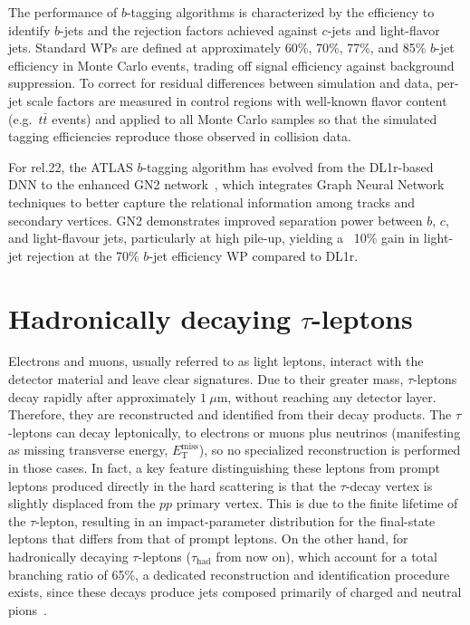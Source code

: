 The performance of $b$-tagging algorithms is characterized by the efficiency to identify $b$-jets and the rejection factors achieved against $c$-jets and light-flavor jets. Standard WPs are defined at approximately 60\%, 70\%, 77\%, and 85\% $b$-jet efficiency in \ttbar Monte Carlo events, trading off signal efficiency against background suppression.  To correct for residual differences between simulation and data, per-jet scale factors are measured in control regions with well-known flavor content (e.g.\ $t\bar t$ events) and applied to all Monte Carlo samples so that the simulated tagging efficiencies reproduce those observed in collision data.

For rel.22, the ATLAS $b$-tagging algorithm has evolved from the DL1r-based DNN to the enhanced GN2 network~\cite{new_tagging}, which integrates Graph Neural Network techniques to better capture the relational information among tracks and secondary vertices. GN2 demonstrates improved separation power between \(b\), \(c\), and light-flavour jets, particularly at high pile-up, yielding a ~10\% gain in light-jet rejection at the 70\% \(b\)-jet efficiency WP compared to DL1r.  


\section{Hadronically decaying $\tau$-leptons}
\label{sec:tauhad}
Electrons and muons, usually referred to as light leptons, interact with the detector material and leave clear signatures. Due to their greater mass, \(\tau\)-leptons decay rapidly after approximately \(1\ \mu\mathrm{m}\), without reaching any detector layer. Therefore, they are reconstructed and identified from their decay products. The \(\tau\)-leptons can decay leptonically, to electrons or muons plus neutrinos (manifesting as missing transverse energy, \(E_{\mathrm{T}}^{\mathrm{miss}}\)), so no specialized reconstruction is performed in those cases. 
In fact, a key feature distinguishing these leptons from prompt leptons produced directly in the hard scattering is that the \(\tau\)-decay vertex is slightly displaced from the \(pp\) primary vertex. This is due to the finite lifetime of the \(\tau\)-lepton, resulting in an impact-parameter distribution for the final-state leptons that differs from that of prompt leptons. 
On the other hand, for hadronically decaying \(\tau\)-leptons (\(\tau_{\text{had}}\) from now on), which account for a total branching ratio of 65\%, a dedicated reconstruction and identification procedure exists, since these decays produce jets composed primarily of charged and neutral pions~\cite{PhysRevD.98.030001}.

